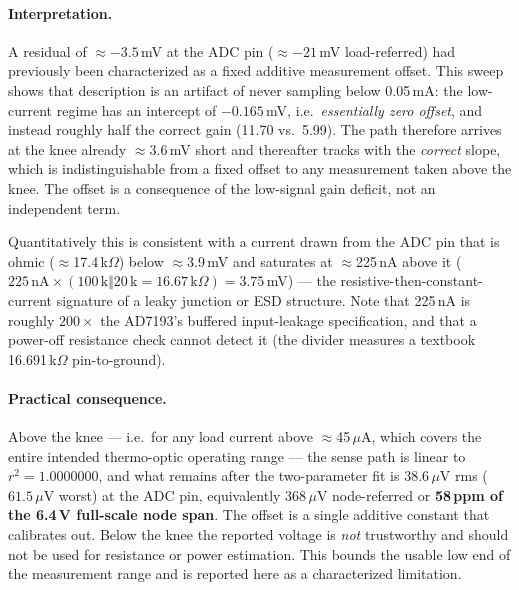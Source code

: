\documentclass[11pt]{article}
\begin{document}
\paragraph{Interpretation.} A residual of $\approx-3.5$\,mV at the ADC pin
($\approx-21$\,mV load-referred) had previously been characterized as a fixed
additive measurement offset. This sweep shows that description is an artifact
of never sampling below 0.05\,mA: the low-current regime has an intercept of
$-0.165$\,mV, i.e.\ \emph{essentially zero offset}, and instead roughly half the
correct gain (11.70 vs.\ 5.99). The path therefore arrives at the knee already
$\approx$3.6\,mV short and thereafter tracks with the \emph{correct} slope,
which is indistinguishable from a fixed offset to any measurement taken above
the knee. The offset is a consequence of the low-signal gain deficit, not an
independent term.

Quantitatively this is consistent with a current drawn from the ADC pin that is
ohmic ($\approx$17.4\,k$\Omega$) below $\approx$3.9\,mV and saturates at
$\approx$225\,nA above it
($225\,\text{nA}\times(100\,\text{k}\Vert20\,\text{k}=16.67\,\text{k}\Omega)=3.75$\,mV)
--- the resistive-then-constant-current signature of a leaky junction or ESD
structure. Note that 225\,nA is roughly $200\times$ the AD7193's buffered
input-leakage specification, and that a power-off resistance check cannot detect
it (the divider measures a textbook 16.691\,k$\Omega$ pin-to-ground).

\paragraph{Practical consequence.} Above the knee --- i.e.\ for any load
current above $\approx$45\,$\mu$A, which covers the entire intended thermo-optic
operating range --- the sense path is linear to $r^2=1.0000000$, and what remains
after the two-parameter fit is $38.6\,\mu$V rms ($61.5\,\mu$V worst) at the ADC
pin, equivalently $368\,\mu$V node-referred or \textbf{58\,ppm of the 6.4\,V
full-scale node span}. The offset is a single additive constant that calibrates
out. Below the knee the reported voltage is \emph{not} trustworthy and should not
be used for resistance or power estimation. This bounds the usable low end of the
measurement range and is reported here as a characterized limitation.
\end{document}
